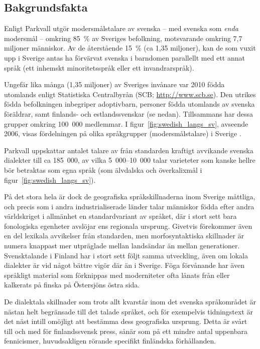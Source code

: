 \begin{multicols}{2}

\subsection{Bakgrundsfakta}
Enligt Parkvall \cite{parkvall2009} utgör modersmålstalare av
svenska -- med svenska som \textit{enda} modersmål -- omkring
85~\% av Sveriges befolkning, motsvarande omkring 7,7 miljoner
människor. Av de återstående 15~\% (ca 1,35 miljoner), kan de som
vuxit upp i Sverige antas ha förvärvat svenska i barndomen parallellt
med ett annat språk (ett inhemskt minoritetsspråk eller ett
invandrarspråk).


Ungefär lika många (1,35 miljoner) av Sveriges invånare var 2010 födda
utomlands enligt Statistiska Centralbyrån
(SCB; \url{http://www.scb.se}). Den utrikes födda befolkningen
inbegriper adoptivbarn, personer födda utomlands av svenska föräldrar,
samt finlands- och estlands­svenskar (se nedan). Tillsammans har dessa
grupper omkring 100~000 medlemmar.  I
figur~\ref{fig:swedish_langs_sv}, avseende 2006, visas fördelningen
på olika språkgrupper (modersmålstalare) i Sverige
\cite{parkvall2009}.

Parkvall \cite{parkvall2009} uppskattar antalet talare av från
standarden kraftigt avvikande svenska dialekter till ca 185~000, av
vilka 5~000--10~000 talar varieteter som kanske hellre bör betraktas
som egna språk (som älvdalska och överkalixmål i
figur~\ref{fig:swedish_langs_sv}).

På det stora hela är dock de geografiska språkskillnaderna inom
Sverige måttliga, och precis som i andra industrialiserade länder
talar människor födda efter andra världskriget i allmänhet en
standardvariant av språket, där i stort sett bara fonologiska
egenheter avslöjar ens regionala ursprung. Givetvis förekommer även en
del lexikala avvikelser från standarden, men morfosyntaktiska
skillnader är numera knappast mer utpräglade mellan landsändar än
mellan generationer. Svensktalande i Finland har i stort sett följt
samma utveckling, även om lokala dialekter är vid något bättre vigör
där än i Sverige. Föga förvånande har även språkligt material som
förknippas med moderniteter ofta lånats från eller kalkerats på finska
på Östersjöns östra sida.

De dialektala skillnader som trots allt kvarstår inom det svenska
språkområdet är nästan helt begränsade till det talade språket, och
för exempelvis tidningstext är det näst intill omöjligt att bestämma
dess geografiska ursprung. Detta är svårt till och med för
finlandssvensk press, sånär som på ett mindre antal uppenbara
fennicismer, huvudsakligen rörande specifikt finländska förhållanden.


\end{multicols}
